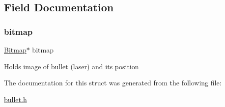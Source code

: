 \subsection{Field Documentation}
\hypertarget{struct_bullet_a00c870e2cedff0b231b1c8ad85019f66}{}\label{struct_bullet_a00c870e2cedff0b231b1c8ad85019f66} 
\subsubsection{\texorpdfstring{bitmap}{bitmap}}
{\footnotesize\ttfamily \hyperlink{struct_bitmap}{Bitmap}$\ast$ bitmap}

Holds image of bullet (laser) and its position 

The documentation for this struct was generated from the following file\+:\begin{DoxyCompactItemize}
\item 
\hyperlink{bullet_8h}{bullet.\+h}\end{DoxyCompactItemize}

